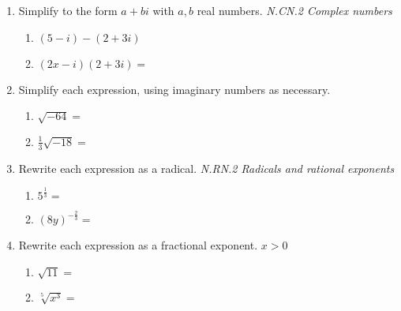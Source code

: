 \documentclass[12pt, twoside]{article}
\begin{document}
\begin{enumerate}[itemsep=0.5cm]
\item Simplify to the form $a+bi$ with $a,b$ real numbers. \hfill \emph{N.CN.2 Complex numbers}
    \begin{multicols}{2}
        \begin{enumerate}[itemsep=1.5cm]
            \item $(5 - i) - (2 + 3i)$
            \item $(2x - i)(2 + 3i)=$
        \end{enumerate}
    \end{multicols}  \vspace{5cm}

\item Simplify each expression, using imaginary numbers as necessary.
    \begin{multicols}{2}
    \begin{enumerate}[itemsep=0.5cm]
        \item $\sqrt{-64}=$
        \item $\displaystyle \frac{1}{3} \sqrt{-18}=$
    \end{enumerate}
    \end{multicols} \vspace{1cm}
  
\item Rewrite each expression as a radical. \hfill \emph{N.RN.2 Radicals and rational exponents} \vspace{0.25cm}
    \begin{multicols}{2}
      \begin{enumerate}[itemsep=1cm]
        \item $\displaystyle 5^{\frac{1}{3}}=$
        \item $\displaystyle (8y)^{-\frac{2}{3}}=$
      \end{enumerate}
      \end{multicols} \vspace{1cm}
      
\item Rewrite each expression as a fractional exponent. $x>0$  \vspace{0.25cm}
    \begin{multicols}{2}
      \begin{enumerate}[itemsep=1cm]
          \item $\sqrt{11} =$
          \item $\sqrt[5]{x^3} =$
      \end{enumerate}
      \end{multicols}


\end{enumerate}
\end{document}
